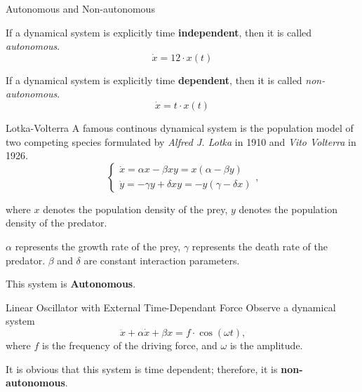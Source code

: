 \documentclass[18pt]{beamer}
\begin{document}
\begin{frame}{Autonomous and Non-autonomous}
        \begin{definition}
            If a dynamical system is explicitly time \textbf{independent}, then it is called \textit{autonomous}.
        \[\dot{x} = 12 \cdot x(t)\]
        \end{definition}
        \begin{definition}
            If a dynamical system is explicitly time \textbf{dependent}, then it is called \textit{non-autonomous}.
        \[\dot{x} = t \cdot x(t)\]
        \end{definition}
\end{frame}

\begin{frame}{Lotka-Volterra}
    A famous continous dynamical system is the population model of two competing species formulated by \textit{Alfred J. Lotka} in 1910 and \textit{Vito Volterra} in 1926.
    \begin{equation}
        \begin{cases}
            \dot{x} = \alpha x - \beta xy = x(\alpha - \beta y)\\
            \dot{y} = -\gamma y + \delta xy = -y(\gamma - \delta x)
        \end{cases}
        \text{,}
    \end{equation}

    \pause{}

    where $x$ denotes the population density of the prey, $y$ denotes the population density of the predator.

    \pause{}

    $\alpha$ represents the growth rate of the prey, $\gamma$ represents the death rate of the predator. $\beta$ and $\delta$ are constant interaction parameters.

    \pause{}

    This system is \textbf{Autonomous}.
\end{frame}

\begin{frame}{Linear Oscillator with External Time-Dependant Force}
    Observe a dynamical system
    \[\ddot{x} + \alpha \dot{x} + \beta x = f \cdot \cos(\omega t)\text{,}\]
    where $f$ is the frequency of the driving force, and $\omega$ is the amplitude.

    \pause{}
    It is obvious that this system is time dependent; therefore, it is \textbf{non-autonomous}.
\end{frame}
\end{document}
